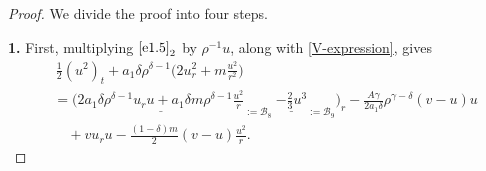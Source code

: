 \documentclass[11pt,reqno]{amsart}
\numberwithin{rk}{section}
\numberwithin{prop}{section}
\numberwithin{mydef}{section}
\numberwithin{lem}{section}
\numberwithin{equation}{section}
\numberwithin{thm}{section}
\begin{document}
\begin{proof}
We divide the proof into four steps.

\smallskip
\textbf{1.}
First, multiplying $\eqref{e1.5}_2$ by $\rho^{-1}u$, along with \eqref{V-expression}, gives
\begin{equation}\label{eq:6.14}
\begin{aligned}
&\,\frac{1}{2}(u^2)_t +a_1\delta\rho^{\delta-1}\big(2 u_r^2+ m\frac{u^2}{r^2}\big)\\
&=\Big(\underline{2a_1\delta\rho^{\delta-1} u_ru+a_1 \delta m\rho^{\delta-1}\frac{u^2}{r}}_{:=\mathcal{B}_8}\ \underline{-\frac{2}{3}u^3}_{:=\mathcal{B}_9}\Big)_r-\frac{A\gamma}{2a_1\delta}\rho^{\gamma-\delta}(v-u)u\\
&\quad + vu_ru-\frac{(1-\delta)m}{2}(v-u)\frac{u^2}{r}.
\end{aligned} 
\end{equation}



\end{proof}
\end{document}
